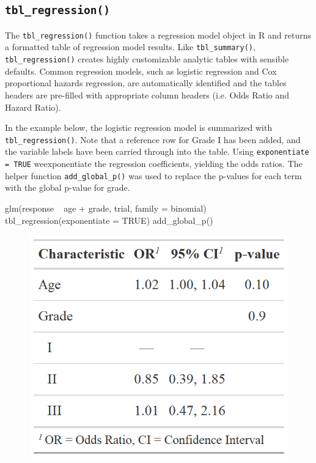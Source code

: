 \subsection{\texorpdfstring{\texttt{tbl\_regression()}}{tbl\_regression()}}

The \texttt{tbl\_regression()} function takes a regression model object in R and returns a formatted table of regression model results. 
Like \texttt{tbl\_summary()}, \texttt{tbl\_regression()} creates highly customizable analytic tables with sensible defaults.
Common regression models, such as logistic regression and Cox proportional hazards regression, are automatically identified and the tables headers are pre-filled with appropriate column headers (i.e. Odds Ratio and Hazard Ratio).

In the example below, the logistic regression model is summarized with \texttt{tbl\_regression()}.
Note that a reference row for Grade I has been added, and the variable labels have been carried through into the table.
Using \texttt{exponentiate = TRUE}  weexponentiate the regression coefficients, yielding the odds ratios.
The helper function \texttt{add\_global\_p()} was used to replace the p-values for each term with the global p-value for grade.

\begin{example}
glm(response ~ age + grade, trial, family = binomial) %
  tbl_regression(exponentiate = TRUE) %
  add_global_p()
\end{example}

\begin{figure}[h!]
  \includegraphics[scale=0.28]{regression.png}
  \centering
\end{figure}


